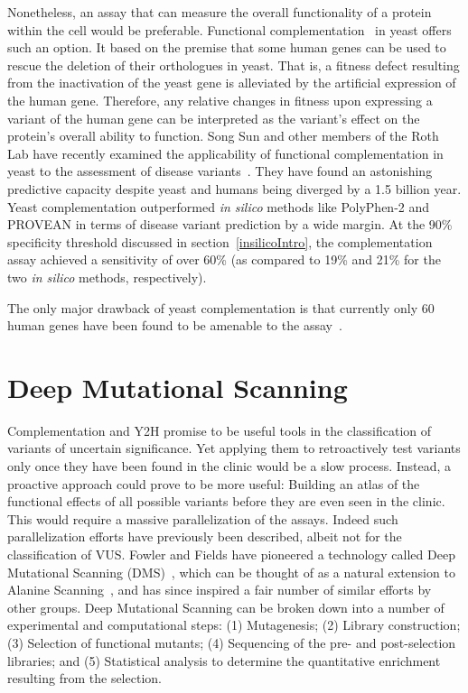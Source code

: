 Nonetheless, an assay that can measure the overall functionality of a protein within the cell would be preferable. Functional complementation~\cite{complementation} in yeast offers such an option. It based on the premise that some human genes can be used to rescue the deletion of their orthologues in yeast. That is, a fitness defect resulting from the inactivation of the yeast gene is alleviated by the artificial expression of the human gene. Therefore, any relative changes in fitness upon expressing a variant of the human gene can be interpreted as the variant's effect on the protein's overall ability to function. Song Sun and other members of the Roth Lab have recently examined the applicability of functional complementation in yeast to the assessment of disease variants~\cite{sun_extended_2016}. They have found an astonishing predictive capacity despite yeast and humans being diverged by a 1.5 billion year. Yeast complementation outperformed \textit{in silico} methods like PolyPhen-2 and PROVEAN in terms of disease variant prediction by a wide margin. At the 90\% specificity threshold discussed in section~\ref{insilicoIntro}, the complementation assay achieved a sensitivity of over 60\% (as compared to 19\% and 21\% for the two \textit{in silico} methods, respectively).

The only major drawback of yeast complementation is that currently only 60 human genes have been found to be amenable to the assay~\cite{sun_extended_2016}. %



\section{Deep Mutational Scanning}

Complementation and Y2H promise to be useful tools in the classification of variants of uncertain significance. Yet applying them to retroactively test variants only once they have been found in the clinic would be a slow process. Instead, a proactive approach could prove to be more useful: Building an atlas of the functional effects of all possible variants before they are even seen in the clinic. This would require a massive parallelization of the assays. Indeed such parallelization efforts have previously been described, albeit not for the classification of VUS. Fowler and Fields have pioneered a technology called Deep Mutational Scanning (DMS)~\cite{fowler_high-resolution_2010}, which can be thought of as a natural extension to Alanine Scanning~\cite{AlanineScanning}, and has since inspired a fair number of similar efforts by other groups\cite{EverythingDMS}.
Deep Mutational Scanning can be broken down into a number of experimental and computational steps: (1) Mutagenesis; (2) Library construction; (3) Selection of functional mutants; (4) Sequencing of the pre- and post-selection libraries; and (5) Statistical analysis to determine the quantitative enrichment resulting from the selection. 

